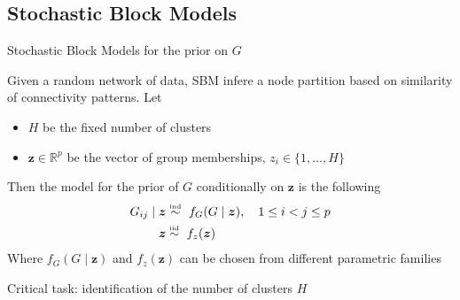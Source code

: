 \subsection{Stochastic Block Models}
\begin{frame}{Stochastic Block Models for the prior on $G$}

Given a random network of data, SBM \alert{infere a node partition} based on similarity of connectivity patterns. Let
\begin{itemize}
    \item $H$ be the fixed number of clusters
    \item $\bm{z} \in \mathbb{R}^p$ be the vector of group memberships, $z_{i} \in \{1,\ldots,H\}$
\end{itemize} 

Then the model for the prior of $G$ conditionally on $\bm{z}$ is the following
\begin{align*}
    G_{ij} \mid \bm{z} &\ind\  f_{G}(G \mid \bm{z}) , \quad 1 \le i < j \le p \\ %
    \bm{z} &\iid\ f_{z}(\bm{z})
\end{align*}
Where $f_{G}(G \mid \bm{z})$ and $f_{z}(\bm{z})$ can be chosen from different parametric families
\pause
\begin{center}
    Critical task: \alert{identification of the number of clusters $H$}
\end{center}

\end{frame}







